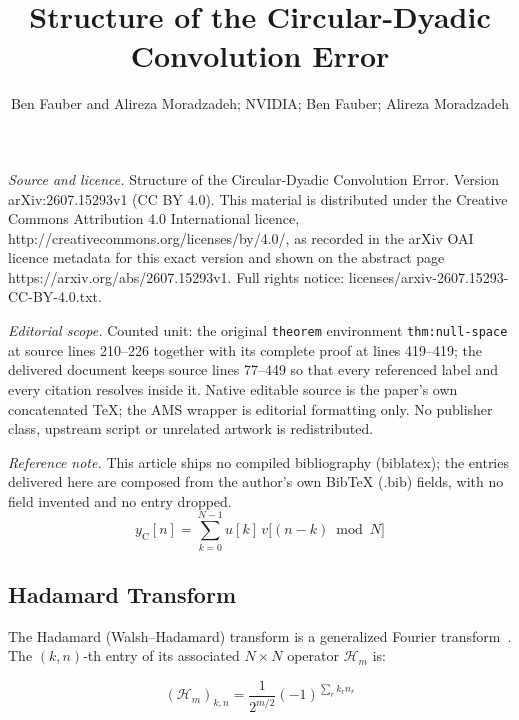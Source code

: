 \documentclass[10pt,a4paper]{amsart}
\begin{document}
\title[Structure of the Circular-Dyadic Convolution Error]{Structure of the Circular-Dyadic Convolution Error}
\author{Ben Fauber and Alireza Moradzadeh; NVIDIA; Ben Fauber; Alireza Moradzadeh}
\date{}
\maketitle
\noindent\emph{Source and licence.} Structure of the Circular-Dyadic Convolution Error. Version arXiv:2607.15293v1 (CC BY 4.0). This material is distributed under the Creative Commons Attribution 4.0 International licence, http://creativecommons.org/licenses/by/4.0/, as recorded in the arXiv OAI licence metadata for this exact version and shown on the abstract page https://arxiv.org/abs/2607.15293v1. Full rights notice: licenses/arxiv-2607.15293-CC-BY-4.0.txt.\par\smallskip
\noindent\textit{Editorial scope.} Counted unit: the original \texttt{theorem} environment \texttt{thm:null-space} at source lines 210--226 together with its complete proof at lines 419--419; the delivered document keeps source lines 77--449 so that every referenced label and every citation resolves inside it. Native editable source is the paper's own concatenated TeX; the AMS wrapper is editorial formatting only. No publisher class, upstream script or unrelated artwork is redistributed.
\par\smallskip\noindent\textit{Reference note.} This article ships no compiled bibliography (biblatex); the entries delivered here are composed from the author's own BibTeX (.bib) fields, with no field invented and no entry dropped.
\begin{equation}
   \label{eq:circ-conv}
   y_{\mathrm{C}}[n] = \sum_{k=0}^{N-1} u[k]\,v\bigl[(n-k)\bmod N\bigr]
\end{equation}

\subsection{Hadamard Transform}
\label{sec:hadamard-transform}

The Hadamard (Walsh--Hadamard) transform is a generalized Fourier transform~\cite{walsh1923closed, shanks1969ITCmp.100.457S, beauchamp1975walsh}. The $(k,n)$-th entry of its associated $N \times N$ operator $\mathcal{H}_m$ is:
 
 \begin{equation}                                      
 \label{eq:hadamard-entry}
   (\mathcal{H}_{m})_{k,n}={\frac {1}{2^{m/2}}}(-1)^{\sum _{r} k_{r} n_{r}}
\end{equation}
\end{document}
